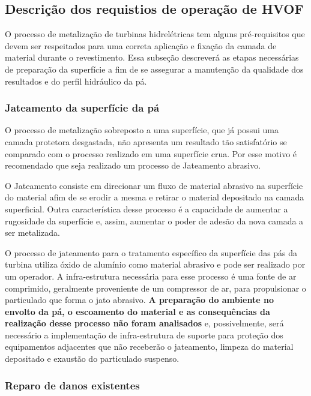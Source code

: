 \subsection{Descrição dos requistios de operação de HVOF}

O processo de metalização de turbinas hidrelétricas tem alguns pré-requisitos
que devem ser respeitados para uma correta aplicação e fixação da camada de
material durante o revestimento. Essa subseção descreverá as etapas necessárias
de preparação da superfície a fim de se assegurar a manutenção da qualidade dos resultados e do
perfil hidráulico da pá. 

\subsubsection{Jateamento da superfície da pá}

O processo de metalização sobreposto a uma superfície, que já possui uma camada
protetora desgastada, não apresenta um resultado tão satisfatório se comparado
com o processo realizado em uma superfície crua. Por esse motivo é recomendado
que seja realizado um processo de Jateamento abrasivo. 

O Jateamento consiste em direcionar um fluxo de material abrasivo na superfície
do material afim de se erodir a mesma e retirar o material depositado na camada
superficial. Outra característica desse processo é a capacidade de aumentar a
rugosidade da superfície e, assim, aumentar o poder de adesão da nova camada a
ser metalizada.  

O processo de jateamento para o tratamento específico da superfície das pás da
turbina utiliza óxido de alumínio como material abrasivo e pode ser realizado
por um operador. A infra-estrutura necessária para esse processo é uma fonte de
ar comprimido, geralmente proveniente de um compressor de ar, para propulsionar
o particulado que forma o jato abrasivo. \textbf{A preparação do ambiente no envolto da pá, 
o escoamento do material e
as consequências da realização desse processo não foram analisados} e,
possivelmente, será necessário a implementação de infra-estrutura de suporte
para proteção dos equipamentos adjacentes que não receberão o jateamento,
limpeza do material depositado e exaustão do particulado suspenso.

\subsubsection{Reparo de danos existentes}


